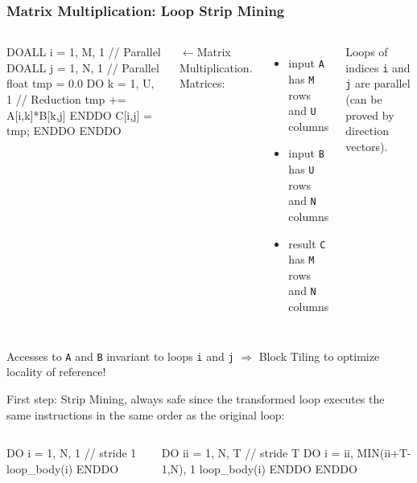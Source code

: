 \documentclass{beamer}
\renewcommand{\emph}[1]{\textcolor{structure}{#1}}
\newcommand{\emp}[1]{\textcolor{DikuRed}{ #1}}
\newcommand{\emphh}[1]{\textcolor{CosGreen}{ #1}}
\begin{document}
\begin{frame}[fragile,t]
  \frametitle{Matrix Multiplication: Loop Strip Mining} %

\begin{columns}
\begin{colorcode}[fontsize=\scriptsize]
DOALL i = 1, M, 1    \emphh{// Parallel}
  DOALL j = 1, N, 1  \emphh{// Parallel}
    float tmp = 0.0
    DO k = 1, U, 1 \emp{// Reduction}
      tmp += A[i,k]*B[k,j] 
    ENDDO                  
    C[i,j] = tmp;          
  ENDDO
ENDDO
\end{colorcode}
$\leftarrow$Matrix Multiplication. Matrices:\smallskip
\begin{itemize}
    \item input {\tt A} has {\tt M} rows and {\tt U} columns
    \item input {\tt B} has {\tt U} rows and {\tt N} columns
    \item result {\tt C} has {\tt M} rows and {\tt N} columns 
\end{itemize}

Loops of indices {\tt i} and {\tt j} are parallel
(can be proved by direction vectors).
\end{columns}
\medskip

\emph{Accesses to {\tt A} and {\tt B} invariant to loops {\tt i} and {\tt j} $\Rightarrow$ Block Tiling to optimize locality of reference!}  
\pause
\bigskip

First step: Strip Mining, always safe since 
the transformed loop executes the same instructions in the same 
order as the original loop:\medskip

\begin{columns}
\begin{colorcode}[fontsize=\scriptsize]
DO i = 1, N, 1  \alert{// stride 1}
  loop_body(i)
ENDDO


\end{colorcode}
\begin{colorcode}[fontsize=\scriptsize]
DO ii = 1, N, T        \alert{// stride T}
  DO i = ii, MIN(ii+T-1,N), 1 
    loop_body(i)
  ENDDO
ENDDO
\end{colorcode}
\end{columns}
\end{frame}
\end{document}
